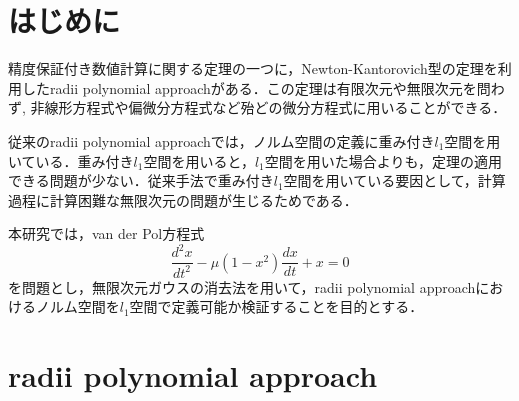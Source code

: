 \documentclass[a4paper,10pt,twocolumn]{jsarticle}
\title{\vspace{-8mm}{\Large \gtfamily\mdseries\upshape 無限次元ガウスの消去法を用いた \rad{}改良 }\vspace{-3mm}}
\date{}
\author{（指導教員 関根 晃太 准教授） \\ 関根研究室 2131701 齋藤 悠希
\vspace{-5mm}}
\newcommand{\rad}{radii polynomial approach}
\newcommand{\nk}{Newton-Kantorovich}
\newcommand{\vdp}{van der Pol方程式}
\begin{document}
\maketitle
\vspace{-10mm}



\section{はじめに}
\vspace{-1mm}
精度保証付き数値計算に関する定理の一つに，\nk{}型の定理を利用した\rad{}がある．この定理は有限次元や無限次元を問わず, 非線形方程式や偏微分方程式など殆どの微分方程式に用いることができる．

従来の\rad{}では，ノルム空間の定義に重み付き$l_1$空間を用いている．重み付き$l_1$空間を用いると，$l_1$空間を用いた場合よりも，定理の適用できる問題が少ない．従来手法で重み付き$l_1$空間を用いている要因として，計算過程に計算困難な無限次元の問題が生じるためである．

本研究では，\vdp{}
\begin{equation}
  \frac{d^2x}{dt^2} - \mu (1-x^2)\frac{dx}{dt}+x=0
\end{equation}
を問題とし，無限次元ガウスの消去法を用いて，\rad{}におけるノルム空間を$l_1$空間で定義可能か検証することを目的とする．



\vspace{-1mm}
\section{\rad{} \cite{github}}
\vspace{-1mm}
\end{document}
